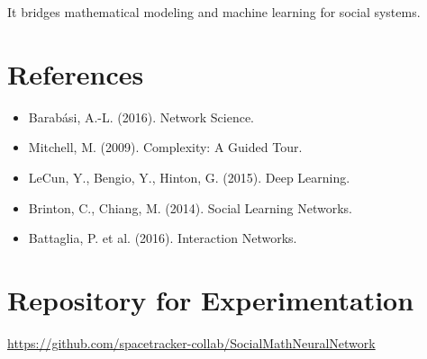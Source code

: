 \documentclass[12pt]{article}
\begin{document}
It bridges mathematical modeling and machine learning for social systems.

\section{References}

\begin{itemize}
\item Barabási, A.-L. (2016). Network Science.
\item Mitchell, M. (2009). Complexity: A Guided Tour.
\item LeCun, Y., Bengio, Y., Hinton, G. (2015). Deep Learning.
\item Brinton, C., Chiang, M. (2014). Social Learning Networks.
\item Battaglia, P. et al. (2016). Interaction Networks.
\end{itemize}

\section{Repository for Experimentation}

\noindent
\url{https://github.com/spacetracker-collab/SocialMathNeuralNetwork}
\end{document}
